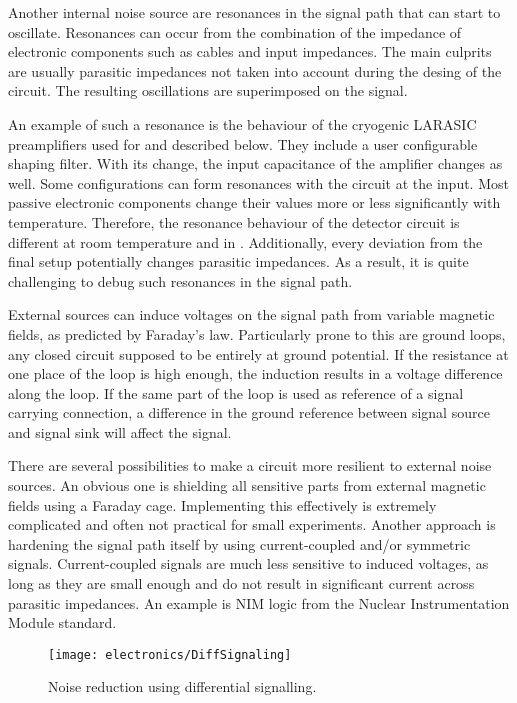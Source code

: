 Another internal noise source are resonances in the signal path that can start to oscillate.
Resonances can occur from the combination of the impedance of electronic components such as cables and input impedances.
The main culprits are usually parasitic impedances not taken into account during the desing of the circuit.
The resulting oscillations are superimposed on the signal.

An example of such a resonance is the behaviour of the cryogenic LARASIC preamplifiers used for \AT{} and described below.
They include a user configurable shaping filter.
With its change, the input capacitance of the amplifier changes as well.
Some configurations can form resonances with the circuit at the input.
Most passive electronic components change their values more or less significantly with temperature.
Therefore, the resonance behaviour of the detector circuit is different at room temperature and in \lar{}.
Additionally, every deviation from the final setup potentially changes parasitic impedances.
As a result, it is quite challenging to debug such resonances in the signal path.

External sources can induce voltages on the signal path from variable magnetic fields, as predicted by Faraday's law.
Particularly prone to this are ground loops, any closed circuit supposed to be entirely at ground potential.
If the resistance at one place of the loop is high enough, the induction results in a voltage difference along the loop.
If the same part of the loop is used as reference of a signal carrying connection, a difference in the ground reference between signal source and signal sink will affect the signal.

There are several possibilities to make a circuit more resilient to external noise sources.
An obvious one is shielding all sensitive parts from external magnetic fields using a Faraday cage.
Implementing this effectively is extremely complicated and often not practical for small experiments.
Another approach is hardening the signal path itself by using current-coupled and/or symmetric signals.
Current-coupled signals are much less sensitive to induced voltages, as long as they are small enough and do not result in significant current across parasitic impedances.
An example is NIM logic from the Nuclear Instrumentation Module standard.

\begin{figure}[htb]
	\centering
	\texttt{[image: electronics/DiffSignaling]}
	\caption{Noise reduction using differential signalling.~\cite{diff_signal}}
	\label{fig:electronics_diff-signal}
\end{figure}

